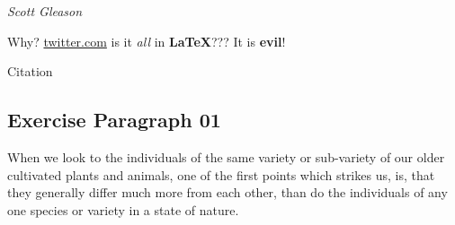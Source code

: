 \textit{Scott Gleason} 

Why? \href{Why}{twitter.com} is it \textit{all} in \textbf{LaTeX}??? It is \textbf{evil}!

Citation\cite{Ferry_2006}

\subsection{Exercise Paragraph 01}

When we look to the individuals of the same variety or sub-variety of our older cultivated plants and animals, one of the first points which strikes us, is, that they generally differ much more from each other, than do the individuals of any one species or variety in a state of nature.